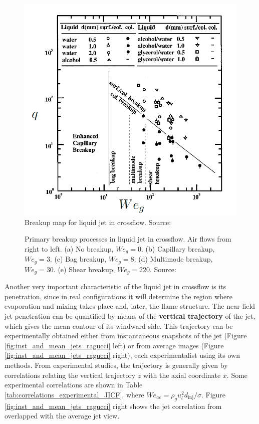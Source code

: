 \begin{figure}[h!]
	\centering
	\includegraphics[scale=0.55]{./part0_intro/jicf_breakup_regime_wu}
	\caption{Breakup map for liquid jet in crossflow. Source: \citeColor[wu_breakup_1997]}
	\label{fig:jicf_breakup_regime_wu}
\end{figure}

\begin{figure}[h!]
	\centering
	\caption[Primary breakup processes in liquid jet in crossflow]{Primary breakup processes in liquid jet in crossflow. Air flows from right to left. (a) No breakup, $We_g = 0$. (b) Capillary breakup, $We_g = 3$. (c) Bag breakup, $We_g = 8$. (d) Multimode breakup, $We_g = 30$. (e) Shear breakup, $We_g = 220$. Source: }
	\label{fig:jicf_breakup_sallam}
\end{figure}

Another very important characteristic of the liquid jet in crossflow is its penetration, since in real configurations it will determine the region where evaporation and mixing takes place and, later, the flame structure. The near-field jet penetration can be quantified by means of the \textbf{vertical trajectory} of the jet, which gives the mean contour of its windward side. This trajectory can be experimentally obtained either from instantaneous snapshots of the jet (Figure \ref{fig:inst_and_mean_jets_ragucci} left) or from average images (Figure \ref{fig:inst_and_mean_jets_ragucci} right), each experimentalist using its own methods. From experimental studies, the trajectory is generally given by correlations relating the vertical trajectory $z$ with the axial coordinate $x$. Some experimental correlations are shown in Table \ref{tab:correlations_experimental_JICF}, where $We_{ae} = \rho_g u_l^2 d_\mathrm{inj}/\sigma$. Figure \ref{fig:inst_and_mean_jets_ragucci} right shows the jet correlation from  overlapped with the average jet view.


